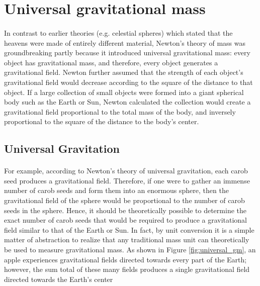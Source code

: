 \documentclass{book}
\begin{document}
    \section{Universal gravitational mass}
    \begin{multicols}{2}
        \paragraph{}
	    In contrast to earlier theories (e.g. celestial spheres) which stated that the heavens were made of entirely different material, Newton's theory of mass was groundbreaking partly because it introduced universal gravitational mass: every object has gravitational mass, and therefore, every object generates a gravitational field. Newton further assumed that the strength of each object's gravitational field would decrease according to the square of the distance to that object. If a large collection of small objects were formed into a giant spherical body such as the Earth or Sun, Newton calculated the collection would create a gravitational field proportional to the total mass of the body, and inversely proportional to the square of the distance to the body's center.
    \end{multicols}
    
    \subsection{Universal Gravitation}
    \paragraph{}
    For example, according to Newton's theory of universal gravitation, each carob seed produces a gravitational field. Therefore, if one were to gather an immense number of carob seeds and form them into an enormous sphere, then the gravitational field of the sphere would be proportional to the number of carob seeds in the sphere. Hence, it should be theoretically possible to determine the exact number of carob seeds that would be required to produce a gravitational field similar to that of the Earth or Sun. In fact, by unit conversion it is a simple matter of abstraction to realize that any traditional mass unit can theoretically be used to measure gravitational mass. As shown in Figure \ref{fig:universal_gm}, an apple experiences gravitational fields directed towards every part of the Earth; however, the sum total of these many fields produces a single gravitational field directed towards the Earth's center
    
\end{document}
